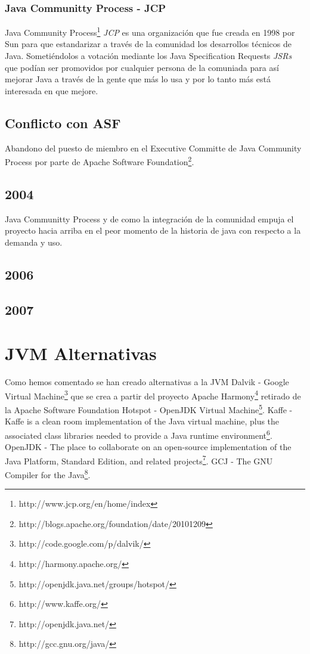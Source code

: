 \documentclass[11pt]{scrartcl}
\begin{document}
\subsubsection{Java Communitty Process - JCP}

Java Community Process\footnote{http://www.jcp.org/en/home/index} \emph{JCP} es una organización que fue creada en 1998 por Sun para que estandarizar a través de la comunidad los desarrollos técnicos de Java. Sometiéndolos a votación mediante los Java Specification Requests \emph{JSRs} que podían ser promovidos por cualquier persona de la comuniada para así mejorar Java a través de la gente que más lo usa y por lo tanto más está interesada en que mejore.

\subsection{Conflicto con ASF}

Abandono del puesto de miembro en el Executive Committe de Java Community Process por parte de Apache Software Foundation\footnote{http://blogs.apache.org/foundation/date/20101209}.

\subsection{2004}

Java Communitty Process y de como la integración de la comunidad empuja el proyecto hacia arriba en el peor momento de la historia de java con respecto a la demanda y uso.%

\subsection{2006}


\subsection{2007}


\section{JVM Alternativas}

Como hemos comentado se han creado alternativas a la JVM 
Dalvik - Google Virtual Machine\footnote{http://code.google.com/p/dalvik/} que se crea a partir del proyecto Apache Harmony\footnote{http://harmony.apache.org/} retirado de la Apache Software Foundation
Hotspot - OpenJDK Virtual Machine\footnote{http://openjdk.java.net/groups/hotspot/}.
Kaffe - Kaffe is a clean room implementation of the Java virtual machine, plus the associated class libraries needed to provide a Java runtime environment\footnote{http://www.kaffe.org/}.
OpenJDK - The place to collaborate on an open-source implementation of the Java Platform, Standard Edition, and related projects\footnote{http://openjdk.java.net/}.
GCJ - The GNU Compiler for the Java\footnote{http://gcc.gnu.org/java/}.
\end{document}
